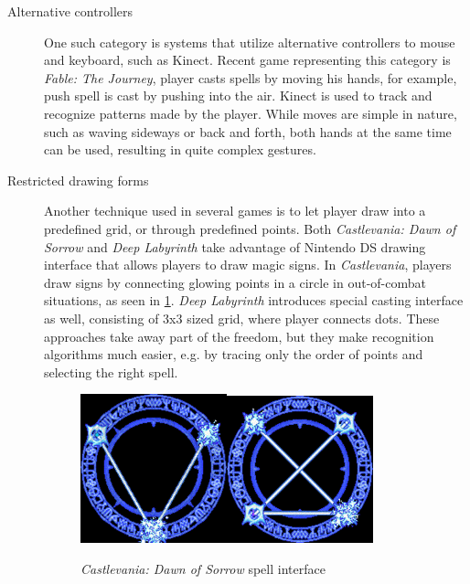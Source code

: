\begin{description}
\item[Alternative controllers]
One such category is systems that utilize alternative controllers to mouse and keyboard, such as Kinect. Recent game representing this category is \emph{Fable: The Journey}, player casts spells by moving his hands, for example, push spell is cast by pushing into the air. Kinect is used to track and recognize patterns made by the player. While moves are simple in nature, such as waving sideways or back and forth, both hands at the same time can be used, resulting in quite complex gestures.

\item[Restricted drawing forms]
Another technique used in several games is to let player draw into a predefined grid, or through predefined points. Both \emph{Castlevania: Dawn of Sorrow} and \emph{Deep Labyrinth} take advantage of Nintendo DS drawing interface that allows players to draw magic signs. In \emph{Castlevania}, players draw signs by connecting glowing points in a circle in out-of-combat situations, as seen in \cref{fig:castlevania}. \emph{Deep Labyrinth} introduces special casting interface as well, consisting of 3x3 sized grid, where player connects dots. These approaches take away part of the freedom, but they make recognition algorithms much easier, e.g. by tracing only the order of points and selecting the right spell.

\begin{figure}[!htb]
\begin{center}
\label{fig:castlevania}
\includegraphics[width=.3\linewidth]{ext/castlevania.png}\quad\includegraphics[width=.3\linewidth]{ext/castlevania2.png}
\end{center}
    \centering
    \caption{\emph{Castlevania: Dawn of Sorrow} spell interface}
\end{figure}


\end{description}
